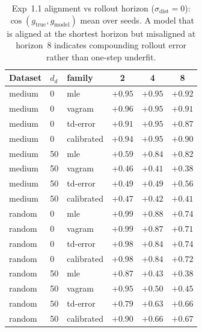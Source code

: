 \begin{table}[htbp]
\centering
\caption{Exp~1.1 alignment vs rollout horizon ($\sigma_{\text{dist}}=0$): $\cos(g_{\text{true}}, g_{\text{model}})$ mean over seeds. A model that is aligned at the shortest horizon but misaligned at horizon~8 indicates compounding rollout error rather than one-step underfit.}
\label{tab:h11horizon}
\begin{tabular}{lllccc}
\toprule
Dataset & $d_d$ & family & 2 & 4 & 8 \\
\midrule
medium & 0 & mle & $+0.95$ & $+0.95$ & $+0.92$ \\
medium & 0 & vagram & $+0.96$ & $+0.95$ & $+0.91$ \\
medium & 0 & td-error & $+0.91$ & $+0.95$ & $+0.87$ \\
medium & 0 & calibrated & $+0.94$ & $+0.95$ & $+0.90$ \\
medium & 50 & mle & $+0.59$ & $+0.84$ & $+0.82$ \\
medium & 50 & vagram & $+0.46$ & $+0.41$ & $+0.38$ \\
medium & 50 & td-error & $+0.49$ & $+0.49$ & $+0.56$ \\
medium & 50 & calibrated & $+0.47$ & $+0.42$ & $+0.41$ \\
random & 0 & mle & $+0.99$ & $+0.88$ & $+0.74$ \\
random & 0 & vagram & $+0.99$ & $+0.87$ & $+0.71$ \\
random & 0 & td-error & $+0.98$ & $+0.84$ & $+0.74$ \\
random & 0 & calibrated & $+0.98$ & $+0.84$ & $+0.72$ \\
random & 50 & mle & $+0.87$ & $+0.43$ & $+0.38$ \\
random & 50 & vagram & $+0.95$ & $+0.50$ & $+0.45$ \\
random & 50 & td-error & $+0.79$ & $+0.63$ & $+0.66$ \\
random & 50 & calibrated & $+0.90$ & $+0.66$ & $+0.67$ \\
\bottomrule
\end{tabular}
\end{table}
